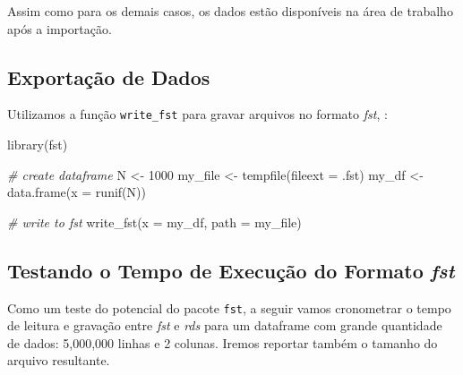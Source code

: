 \documentclass[
  11pt,
]{book}
\newenvironment{Shaded}{\begin{snugshade}}{\end{snugshade}}
\newcommand{\AttributeTok}[1]{\textcolor[rgb]{0.61,0.61,0.61}{#1}}
\newcommand{\CommentTok}[1]{\textcolor[rgb]{0.37,0.37,0.37}{\textit{#1}}}
\newcommand{\DecValTok}[1]{\textcolor[rgb]{0.06,0.06,0.06}{#1}}
\newcommand{\FunctionTok}[1]{\textcolor[rgb]{0,0,0}{#1}}
\newcommand{\NormalTok}[1]{#1}
\newcommand{\OtherTok}[1]{\textcolor[rgb]{0.37,0.37,0.37}{#1}}
\newcommand{\StringTok}[1]{\textcolor[rgb]{0.5,0.5,0.5}{#1}}
\begin{document}
Assim como para os demais casos, os dados estão disponíveis na área de trabalho após a importação.

\hypertarget{exportauxe7uxe3o-de-dados-3}{%
\subsection{Exportação de Dados}\label{exportauxe7uxe3o-de-dados-3}}

Utilizamos a função \texttt{write\_fst} para gravar arquivos no formato \emph{fst}, :

\begin{Shaded}
\begin{Highlighting}[]
\FunctionTok{library}\NormalTok{(fst)}

\CommentTok{\# create dataframe}
\NormalTok{N }\OtherTok{\textless{}{-}} \DecValTok{1000}
\NormalTok{my\_file }\OtherTok{\textless{}{-}} \FunctionTok{tempfile}\NormalTok{(}\AttributeTok{fileext =} \StringTok{\textquotesingle{}.fst\textquotesingle{}}\NormalTok{)}
\NormalTok{my\_df }\OtherTok{\textless{}{-}} \FunctionTok{data.frame}\NormalTok{(}\AttributeTok{x =} \FunctionTok{runif}\NormalTok{(N))}

\CommentTok{\# write to fst}
\FunctionTok{write\_fst}\NormalTok{(}\AttributeTok{x =}\NormalTok{ my\_df, }\AttributeTok{path =}\NormalTok{ my\_file)}
\end{Highlighting}
\end{Shaded}

\hypertarget{testando-o-tempo-de-execuuxe7uxe3o-do-formato-fst}{%
\subsection{\texorpdfstring{Testando o Tempo de Execução do Formato \emph{fst}}{Testando o Tempo de Execução do Formato fst}}\label{testando-o-tempo-de-execuuxe7uxe3o-do-formato-fst}}

Como um teste do potencial do pacote \texttt{fst}, a seguir vamos cronometrar o tempo de leitura e gravação entre \emph{fst} e \emph{rds} para um dataframe com grande quantidade de dados: 5,000,000 linhas e 2 colunas. Iremos reportar também o tamanho do arquivo resultante.
\end{document}
